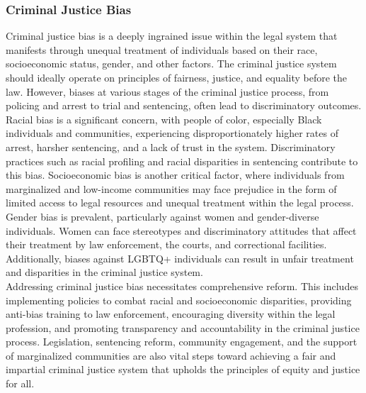 \documentclass[12pt,a4paper,openright,twoside]{book}
\begin{document}
\subsubsection{Criminal Justice Bias}
Criminal justice bias is a deeply ingrained issue within the legal system that manifests through unequal treatment of individuals based on their race, socioeconomic status, gender, and other factors. The criminal justice system should ideally operate on principles of fairness, justice, and equality before the law. However, biases at various stages of the criminal justice process, from policing and arrest to trial and sentencing, often lead to discriminatory outcomes. \cite{doi:10.1080/10345329.2019.1658694} \\
Racial bias is a significant concern, with people of color, especially Black individuals and communities, experiencing disproportionately higher rates of arrest, harsher sentencing, and a lack of trust in the system. Discriminatory practices such as racial profiling and racial disparities in sentencing contribute to this bias. Socioeconomic bias is another critical factor, where individuals from marginalized and low-income communities may face prejudice in the form of limited access to legal resources and unequal treatment within the legal process. \cite{9660177}  \\
Gender bias is prevalent, particularly against women and gender-diverse individuals. Women can face stereotypes and discriminatory attitudes that affect their treatment by law enforcement, the courts, and correctional facilities. Additionally, biases against LGBTQ+ individuals can result in unfair treatment and disparities in the criminal justice system. \cite{gebru2020race} \\
Addressing criminal justice bias necessitates comprehensive reform. This includes implementing policies to combat racial and socioeconomic disparities, providing anti-bias training to law enforcement, encouraging diversity within the legal profession, and promoting transparency and accountability in the criminal justice process. Legislation, sentencing reform, community engagement, and the support of marginalized communities are also vital steps toward achieving a fair and impartial criminal justice system that upholds the principles of equity and justice for all.
\end{document}
